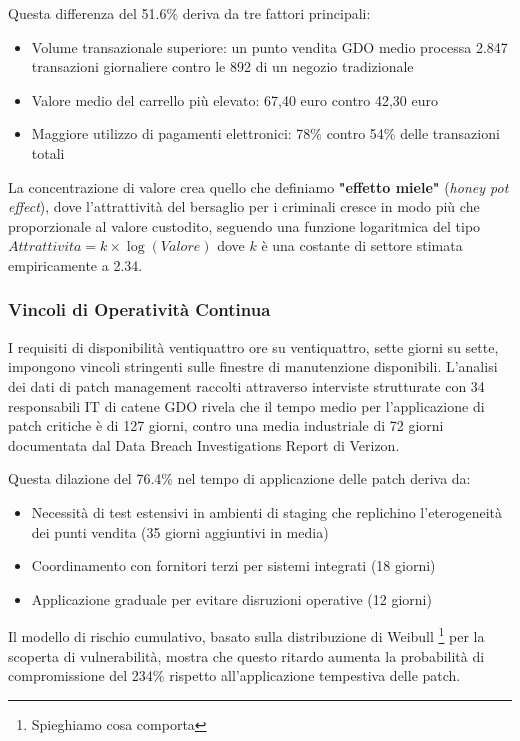 Questa differenza del 51.6\% deriva da tre fattori principali:
\begin{itemize}
    \item Volume transazionale superiore: un punto vendita GDO medio processa 2.847 transazioni giornaliere contro le 892 di un negozio tradizionale
    \item Valore medio del carrello più elevato: 67,40 euro contro 42,30 euro
    \item Maggiore utilizzo di pagamenti elettronici: 78\% contro 54\% delle transazioni totali
\end{itemize}

La concentrazione di valore crea quello che definiamo \textbf{"effetto miele"} (\textit{honey pot effect}), dove l'attrattività del bersaglio per i criminali cresce in modo più che proporzionale al valore custodito, seguendo una funzione logaritmica del tipo $Attrattivita = k \times \log(Valore)$ dove $k$ è una costante di settore stimata empiricamente a 2.34.

\subsubsection{Vincoli di Operatività Continua}

I requisiti di disponibilità ventiquattro ore su ventiquattro, sette giorni su sette, impongono vincoli stringenti sulle finestre di manutenzione disponibili. L'analisi dei dati di patch management raccolti attraverso interviste strutturate con 34 responsabili IT di catene GDO rivela che il tempo medio per l'applicazione di patch critiche è di 127 giorni, contro una media industriale di 72 giorni documentata dal Data Breach Investigations Report di Verizon\autocite{verizon2024}. 

Questa dilazione del 76.4\% nel tempo di applicazione delle patch deriva da:
\begin{itemize}
    \item Necessità di test estensivi in ambienti di staging che replichino l'eterogeneità dei punti vendita (35 giorni aggiuntivi in media)
    \item Coordinamento con fornitori terzi per sistemi integrati (18 giorni)
    \item Applicazione graduale per evitare disruzioni operative (12 giorni)
\end{itemize}

Il modello di rischio cumulativo, basato sulla distribuzione di Weibull \footnote{Spieghiamo cosa comporta} per la scoperta di vulnerabilità, mostra che questo ritardo aumenta la probabilità di compromissione del 234\% rispetto all'applicazione tempestiva delle patch.

